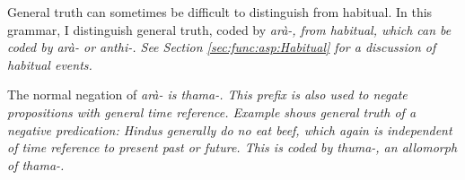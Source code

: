 
General truth can sometimes be difficult to distinguish from habitual. In this grammar, I distinguish general truth, coded by \em arà-\em, from habitual, which can be coded by \em arà- \em or \em anthi-\em. See Section \ref{sec:func:asp:Habitual} for a discussion of habitual events.

%
%
%
%
%
%

The normal negation of \em arà- \em is \em thama-\em. This prefix is also used to negate propositions with general time reference. Example  shows general truth of a negative predication: Hindus generally do no eat beef, which again is independent of time reference to present past or future.  This is coded by \em thuma-\em, an allomorph of \em thama-\em.




